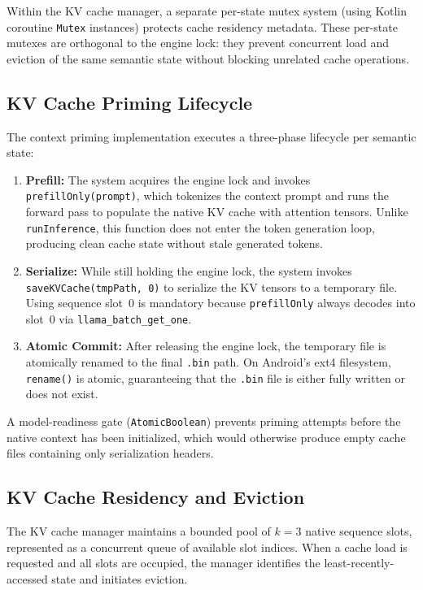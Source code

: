 \documentclass[journal]{IEEEtran}
\begin{document}
Within the KV cache manager, a separate per-state mutex system (using Kotlin coroutine \texttt{Mutex} instances) protects cache residency metadata. These per-state mutexes are orthogonal to the engine lock: they prevent concurrent load and eviction of the same semantic state without blocking unrelated cache operations.

\subsection{KV Cache Priming Lifecycle}
\label{sec:priming}

The context priming implementation executes a three-phase lifecycle per semantic state:

\begin{enumerate}
    \item \textbf{Prefill:} The system acquires the engine lock and invokes \texttt{prefillOnly(prompt)}, which tokenizes the context prompt and runs the forward pass to populate the native KV cache with attention tensors. Unlike \texttt{runInference}, this function does not enter the token generation loop, producing clean cache state without stale generated tokens.

    \item \textbf{Serialize:} While still holding the engine lock, the system invokes \texttt{saveKVCache(tmpPath, 0)} to serialize the KV tensors to a temporary file. Using sequence slot~0 is mandatory because \texttt{prefillOnly} always decodes into slot~0 via \texttt{llama\_batch\_get\_one}.

    \item \textbf{Atomic Commit:} After releasing the engine lock, the temporary file is atomically renamed to the final \texttt{.bin} path. On Android's ext4 filesystem, \texttt{rename()} is atomic, guaranteeing that the \texttt{.bin} file is either fully written or does not exist.
\end{enumerate}

A model-readiness gate (\texttt{AtomicBoolean}) prevents priming attempts before the native context has been initialized, which would otherwise produce empty cache files containing only serialization headers.

\subsection{KV Cache Residency and Eviction}
\label{sec:eviction}

The KV cache manager maintains a bounded pool of $k = 3$ native sequence slots, represented as a concurrent queue of available slot indices. When a cache load is requested and all slots are occupied, the manager identifies the least-recently-accessed state and initiates eviction.
\end{document}
